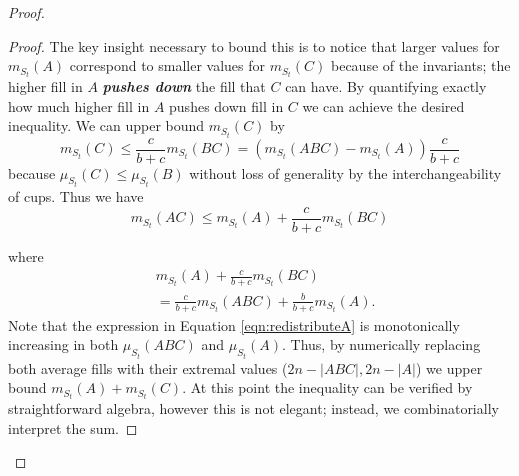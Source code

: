 \documentclass[twocolumn]{article}[10pt]
\newcommand{\defn}[1]{{\textit{\textbf{\boldmath #1}}}\xspace}
\begin{document}
\begin{proof}
\begin{proof}
The key insight necessary to bound this is to notice that larger values for
$m_{S_t}(A)$ correspond to smaller values for $m_{S_t}(C)$ because of the
invariants; the higher fill in $A$ \defn{pushes down} the fill that $C$ can
have. By quantifying exactly how much higher fill in $A$ pushes down fill in
$C$ we can achieve the desired inequality.
We can upper bound $m_{S_t}(C)$ by 
$$m_{S_t}(C) \le \frac{c}{b+c}m_{S_t}(BC) = (m_{S_t}(ABC) - m_{S_t}(A))\frac{c}{b+c}$$ because
$\mu_{S_t}(C) \le \mu_{S_t}(B)$ without loss of generality by the
interchangeability of cups.
Thus we have 
\begin{equation}
  \label{eqn:BCdiscounted}
m_{S_t}(AC) \le m_{S_t}(A) + \frac{c}{b+c}m_{S_t}(BC)
\end{equation}
{\color{red}
where 
\begin{equation}
  \label{eqn:redistributeA}
\begin{split}
  &m_{S_t}(A) + \frac{c}{b+c}m_{S_t}(BC) \\
  &= \frac{c}{b+c}m_{S_t}(ABC) + \frac{b}{b+c}m_{S_t}(A).
\end{split}
\end{equation}
Note that the expression in Equation \ref{eqn:redistributeA} is monotonically
increasing in both $\mu_{S_t}(ABC)$ and $\mu_{S_t}(A)$. 
Thus, by numerically replacing both average fills with
their extremal values ($2n-|ABC|, 2n-|A|$) we upper bound $m_{S_t}(A) + m_{S_t}(C)$.
At this point the inequality can be verified by straightforward algebra,
however this is not elegant; instead, we combinatorially interpret the sum.

}
\end{proof}
\end{proof}
\end{document}
